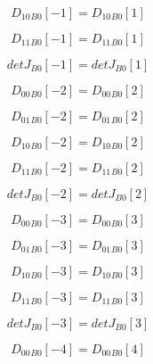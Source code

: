 \documentclass{article}
\begin{document}
\begin{dmath}{D_{10}{_{B0}}}[{-1}] = {D_{10}{_{B0}}}[{1}]\end{dmath}

\begin{dmath}{D_{11}{_{B0}}}[{-1}] = {D_{11}{_{B0}}}[{1}]\end{dmath}

\begin{dmath}{detJ{_{B0}}}[{-1}] = {detJ{_{B0}}}[{1}]\end{dmath}

\begin{dmath}{D_{00}{_{B0}}}[{-2}] = {D_{00}{_{B0}}}[{2}]\end{dmath}

\begin{dmath}{D_{01}{_{B0}}}[{-2}] = {D_{01}{_{B0}}}[{2}]\end{dmath}

\begin{dmath}{D_{10}{_{B0}}}[{-2}] = {D_{10}{_{B0}}}[{2}]\end{dmath}

\begin{dmath}{D_{11}{_{B0}}}[{-2}] = {D_{11}{_{B0}}}[{2}]\end{dmath}

\begin{dmath}{detJ{_{B0}}}[{-2}] = {detJ{_{B0}}}[{2}]\end{dmath}

\begin{dmath}{D_{00}{_{B0}}}[{-3}] = {D_{00}{_{B0}}}[{3}]\end{dmath}

\begin{dmath}{D_{01}{_{B0}}}[{-3}] = {D_{01}{_{B0}}}[{3}]\end{dmath}

\begin{dmath}{D_{10}{_{B0}}}[{-3}] = {D_{10}{_{B0}}}[{3}]\end{dmath}

\begin{dmath}{D_{11}{_{B0}}}[{-3}] = {D_{11}{_{B0}}}[{3}]\end{dmath}

\begin{dmath}{detJ{_{B0}}}[{-3}] = {detJ{_{B0}}}[{3}]\end{dmath}

\begin{dmath}{D_{00}{_{B0}}}[{-4}] = {D_{00}{_{B0}}}[{4}]\end{dmath}
\end{document}
